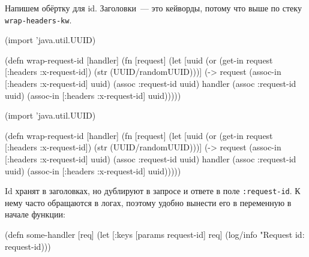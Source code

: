 
Напишем обёртку для id. Заголовки~--- это кейворды, потому что выше по стеку
\verb|wrap-headers-kw|.

\ifx\DEVICETYPE\MOBILE

\begin{english}
  \begin{clojure}
(import 'java.util.UUID)

(defn wrap-request-id [handler]
  (fn [request]
    (let [uuid (or
                (get-in request
                        [:headers
                         :x-request-id])
                (str
                  (UUID/randomUUID)))]
      (-> request
          (assoc-in [:headers
                     :x-request-id] uuid)
          (assoc :request-id uuid)
          handler
          (assoc :request-id uuid)
          (assoc-in [:headers
                     :x-request-id]
                    uuid)))))
  \end{clojure}
\end{english}

\else

\begin{english}
  \begin{clojure}
(import 'java.util.UUID)

(defn wrap-request-id [handler]
  (fn [request]
    (let [uuid (or (get-in request [:headers :x-request-id])
                   (str (UUID/randomUUID)))]
      (-> request
          (assoc-in [:headers :x-request-id] uuid)
          (assoc :request-id uuid)
          handler
          (assoc :request-id uuid)
          (assoc-in [:headers :x-request-id] uuid)))))
  \end{clojure}
\end{english}

\fi


Id хранят в заголовках, но дублируют в запросе и ответе в поле
\verb|:request-id|. К нему часто обращаются в логах, поэтому удобно вынести
его в переменную в начале функции:


\ifx\DEVICETYPE\MOBILE

\begin{english}
  \begin{clojure}
(defn some-handler [req]
  (let [{:keys [params request-id]} req]
    (log/info "Request id: %
              request-id)))
  \end{clojure}
\end{english}

